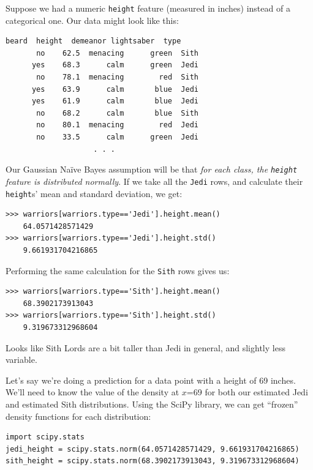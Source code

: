 Suppose we had a numeric \texttt{height} feature (measured in inches) instead
of a categorical one. Our data might look like this:

\begin{Verbatim}[fontsize=\small,samepage=true,frame=none]
    beard  height  demeanor lightsaber  type
       no    62.5  menacing      green  Sith
      yes    68.3      calm      green  Jedi
       no    78.1  menacing        red  Sith
      yes    63.9      calm       blue  Jedi
      yes    61.9      calm       blue  Jedi
       no    68.2      calm       blue  Sith
       no    80.1  menacing        red  Jedi
       no    33.5      calm      green  Jedi
                    . . .
\end{Verbatim}

Our Gaussian Na\"{i}ve Bayes assumption will be that \textit{for each class, the
\texttt{height} feature is distributed normally}. If we take all the
\texttt{Jedi} rows, and calculate their \texttt{height}s' mean and standard
deviation, we get:

\begin{Verbatim}[fontsize=\small,samepage=true,frame=single]
>>> warriors[warriors.type=='Jedi'].height.mean()
    64.0571428571429
>>> warriors[warriors.type=='Jedi'].height.std()
    9.661931704216865
\end{Verbatim}

Performing the same calculation for the \texttt{Sith} rows gives us:

\begin{Verbatim}[fontsize=\small,samepage=true,frame=single]
>>> warriors[warriors.type=='Sith'].height.mean()
    68.3902173913043
>>> warriors[warriors.type=='Sith'].height.std()
    9.319673312968604
\end{Verbatim}

Looks like Sith Lords are a bit taller than Jedi in general, and slightly less
variable.

\vspace{.1in}
Let's say we're doing a prediction for a data point with a height of 69
inches. We'll need to know the value of the density at $x$=69 for both our
estimated Jedi and estimated Sith distributions. Using the SciPy library, we
can get ``frozen'' density functions for each distribution:

\begin{Verbatim}[fontsize=\small,samepage=true,frame=single]
import scipy.stats
jedi_height = scipy.stats.norm(64.0571428571429, 9.661931704216865)
sith_height = scipy.stats.norm(68.3902173913043, 9.319673312968604)
\end{Verbatim}

